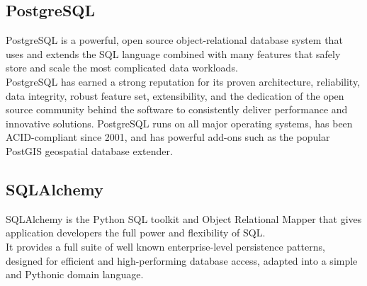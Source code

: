 \subsection{PostgreSQL}
PostgreSQL is a powerful, open source object-relational database system that uses and extends the SQL language combined with many features that safely store and scale the most complicated data workloads.\\
PostgreSQL has earned a strong reputation for its proven architecture, reliability, data integrity, robust feature set, extensibility, and the dedication of the open source community behind the software to consistently deliver performance and innovative solutions. PostgreSQL runs on all major operating systems, has been ACID-compliant since 2001, and has powerful add-ons such as the popular PostGIS geospatial database extender.\\
\subsection{SQLAlchemy}
SQLAlchemy is the Python SQL toolkit and Object Relational Mapper that gives application developers the full power and flexibility of SQL.\\
It provides a full suite of well known enterprise-level persistence patterns, designed for efficient and high-performing database access, adapted into a simple and Pythonic domain language.
